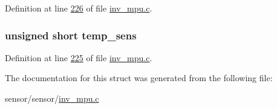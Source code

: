 Definition at line \hyperlink{inv__mpu_8c_source_l00226}{226} of file \hyperlink{inv__mpu_8c_source}{inv\+\_\+mpu.\+c}.

\subsubsection[{\texorpdfstring{temp\+\_\+sens}{temp_sens}}]{\setlength{\rightskip}{0pt plus 5cm}unsigned short temp\+\_\+sens}\hypertarget{structhw__s_ab73e7066167ecd424b3a619cddd0939a}{}\label{structhw__s_ab73e7066167ecd424b3a619cddd0939a}


Definition at line \hyperlink{inv__mpu_8c_source_l00225}{225} of file \hyperlink{inv__mpu_8c_source}{inv\+\_\+mpu.\+c}.



The documentation for this struct was generated from the following file\+:\begin{DoxyCompactItemize}
\item 
sensor/sensor/\hyperlink{inv__mpu_8c}{inv\+\_\+mpu.\+c}\end{DoxyCompactItemize}
